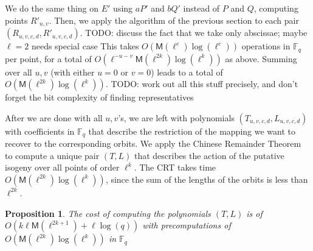 \documentclass{lms}
\newcommand{\todo}[1]{{\color{red}TODO: #1}}
\newtheorem{prop}[thm]{Proposition}
\newcommand{\M}{\mathsf{M}}
\newcommand{\F}{\mathbb{F}}
\begin{document}
We do the same thing on $E'$ using $aP'$ and $bQ'$ instead of $P$ and
$Q$, computing points $R'_{u,v}$. Then, we apply the algorithm of 
the previous section to each pair $(R_{u,v,c,d},R'_{u,v,c,d})$. \todo{discuss
the fact that we take only abscissae; maybe $\ell=2$ needs special case}
This takes $O(\M(\ell^e)\log(\ell^e))$ operations in $\F_q$ per point,
for a total of $O( \ell^{-u-v} \M(\ell^{2k})\log(\ell^k))$ as above.
Summing over all $u,v$ 
(with either $u=0$ or $v=0$) leads to a total
of $O(\M(\ell^{2k})\log(\ell^k))$.
\todo{work out all this stuff precisely, and don't forget the bit complexity of 
finding representatives}

After we are done with all $u,v$'s, we are left with polynomials
$(T_{u,v,c,d},L_{u,v,c,d})$ with coefficients in $\F_q$ that describe
the restriction of the mapping we want to recover to the corresponding
orbits. We apply the Chinese Remainder Theorem to compute a unique
pair $(T,L)$ that describes the action of the putative isogeny over
all points of order $\ell^k$. The CRT takes time
$O(\M(\ell^{2k})\log(\ell^k))$, since the sum of the lengths of the
orbits is less than $\ell^{2k}$.

\begin{prop} \label{prop: cout-interp}
The cost of computing the polynomials $(T,L)$ is of $O(k\ell\mathsf{M}(\ell^{2k+1})+\mathsf{\ell}\log(q))$ with precomputations of $O(\M(\ell^{2k})\log(\ell^k))$ in $\mathbb{F}_q$
\end{prop}

 

\end{document}

